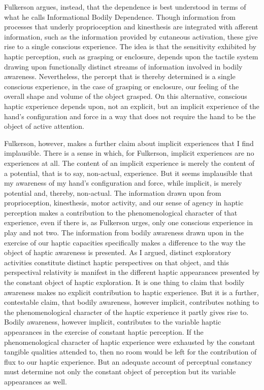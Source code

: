 \documentclass[12pt]{article}
\begin{document}
Fulkerson argues, instead, that the dependence is best understood in terms of what he calls Informational Bodily Dependence. Though information from processes that underly proprioception and kinesthesis are integrated with afferent information, such as the information provided by cutaneous activation, these give rise to a single conscious experience. The idea is that the sensitivity exhibited by haptic perception, such as grasping or enclosure, depends upon the tactile system drawing upon functionally distinct streams of information involved in bodily awareness. Nevertheless, the percept that is thereby determined is a single conscious experience, in the case of grasping or enclosure, our feeling of the overall shape and volume of the object grasped. On this alternative, conscious haptic experience depends upon, not an explicit, but an implicit experience of the hand's configuration and force in a way that does not require the hand to be the object of active attention.

Fulkerson, however, makes a further claim about implicit experiences that I find implausible. There is a sense in which, for Fulkerson, implicit experiences are no experiences at all. The content of an implicit experience is merely the content of a potential, that is to say, non-actual, experience. But it seems implausible that my awareness of my hand's configuration and force, while implicit, is merely potential and, thereby, non-actual. The information drawn upon from proprioception, kinesthesis, motor activity, and our sense of agency in haptic perception makes a contribution to the phenomenological character of that experience, even if there is, as Fulkerson urges, only one conscious experience in play and not two. The information from bodily awareness drawn upon in the exercise of our haptic capacities specifically makes a difference to the way the object of haptic awareness is presented. As I argued, distinct exploratory activities constitute distinct haptic perspectives on that object, and this perspectival relativity is manifest in the different haptic appearances presented by the constant object of haptic exploration. It is one thing to claim that bodily awareness makes no explicit contribution to haptic experience. But it is a further, contestable claim, that bodily awareness, however implicit, contributes nothing to the phenomenological character of the haptic experience it partly gives rise to. Bodily awareness, however implicit, contributes to the variable haptic appearances in the exercise of constant haptic perception. If the phenomenological character of haptic experience were exhausted by the constant tangible qualities attended to, then no room would be left for the contribution of flux to our haptic experience. But an adequate account of perceptual constancy must determine not only the constant object of perception but its variable appearances as well. 
\end{document}
